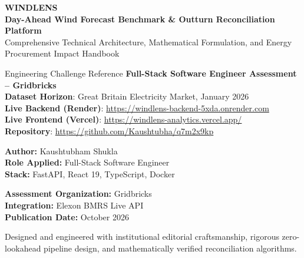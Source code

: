 \documentclass[11pt,a4paper]{article}
\begin{document}
\begin{titlepage}
    \centering
    \vspace*{1.5cm}
    
    {\Huge \textbf{\color{primaryteal}WINDLENS}}\\[0.4cm]
    {\Large \textbf{\color{darkslate}Day-Ahead Wind Forecast Benchmark \& Outturn Reconciliation Platform}}\\[0.8cm]
    {\large Comprehensive Technical Architecture, Mathematical Formulation, and Energy Procurement Impact Handbook}\\[1.5cm]
    
    \begin{infobox}{Engineering Challenge Reference}
        \centering
        \textbf{Full-Stack Software Engineer Assessment -- Gridbricks}\\
        \textbf{Dataset Horizon}: Great Britain Electricity Market, January 2026\\
        \textbf{Live Backend (Render)}: \url{https://windlens-backend-5xda.onrender.com}\\
        \textbf{Live Frontend (Vercel)}: \url{https://windlens-analytics.vercel.app/}\\
        \textbf{Repository}: \url{https://github.com/Kaushtubha/q7m2x9kp}
    \end{infobox}
    
    \vspace{2.5cm}
    
    \begin{minipage}{0.48\textwidth}
        \textbf{Author:} Kaushtubham Shukla\\
        \textbf{Role Applied:} Full-Stack Software Engineer\\
        \textbf{Stack:} FastAPI, React 19, TypeScript, Docker\\
    \end{minipage}
    \hfill
    \begin{minipage}{0.48\textwidth}
        \raggedleft
        \textbf{Assessment Organization:} Gridbricks\\
        \textbf{Integration:} Elexon BMRS Live API\\
        \textbf{Publication Date:} October 2026\\
    \end{minipage}
    
    \vfill
    {\footnotesize \color{gray} Designed and engineered with institutional editorial craftsmanship, rigorous zero-lookahead pipeline design, and mathematically verified reconciliation algorithms.}
\end{titlepage}
\end{document}
